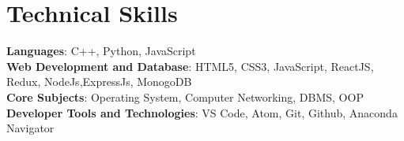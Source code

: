\documentclass[letterpaper,11pt]{article}
\begin{document}
%
\section{Technical Skills}
\vspace{4pt}
 \begin{itemize}[leftmargin=0.15in, label={}]
	\small{\item{
 	\textbf{Languages}{: C++, Python, JavaScript} \\
 	\textbf{Web Development and Database}{: HTML5, CSS3, JavaScript, ReactJS, Redux, NodeJs,ExpressJs, MonogoDB} \\
 	\textbf{Core Subjects}{: Operating System, Computer Networking, DBMS, OOP} \\
 	\textbf{Developer Tools and Technologies}{: VS Code, Atom, Git, Github, Anaconda Navigator} \\
	}}
 \end{itemize}
 \vspace{-16pt}
\end{document}
